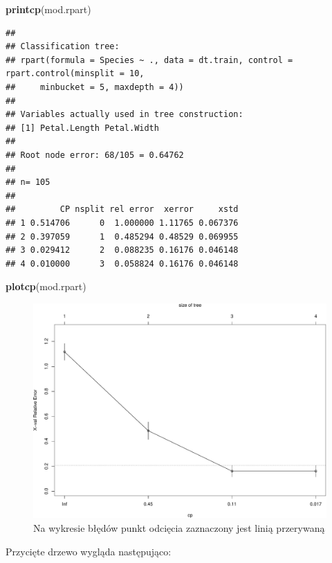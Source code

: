 \documentclass[
]{book}
\newenvironment{Shaded}{\begin{snugshade}}{\end{snugshade}}
\newcommand{\KeywordTok}[1]{\textcolor[rgb]{0.13,0.29,0.53}{\textbf{#1}}}
\newcommand{\NormalTok}[1]{#1}
\theoremstyle{plain}
\theoremstyle{definition}
\theoremstyle{definition}
\theoremstyle{definition}
\theoremstyle{definition}
\theoremstyle{remark}
\begin{document}
\begin{Shaded}
\begin{Highlighting}[]
\KeywordTok{printcp}\NormalTok{(mod.rpart)}
\end{Highlighting}
\end{Shaded}

\begin{verbatim}
## 
## Classification tree:
## rpart(formula = Species ~ ., data = dt.train, control = rpart.control(minsplit = 10, 
##     minbucket = 5, maxdepth = 4))
## 
## Variables actually used in tree construction:
## [1] Petal.Length Petal.Width 
## 
## Root node error: 68/105 = 0.64762
## 
## n= 105 
## 
##         CP nsplit rel error  xerror     xstd
## 1 0.514706      0  1.000000 1.11765 0.067376
## 2 0.397059      1  0.485294 0.48529 0.069955
## 3 0.029412      2  0.088235 0.16176 0.046148
## 4 0.010000      3  0.058824 0.16176 0.046148
\end{verbatim}

\begin{Shaded}
\begin{Highlighting}[]
\KeywordTok{plotcp}\NormalTok{(mod.rpart)}
\end{Highlighting}
\end{Shaded}

\begin{figure}
\centering
\includegraphics{EksploracjaDanych_files/figure-latex/unnamed-chunk-17-1.pdf}
\caption{\label{fig:unnamed-chunk-17}Na wykresie błędów punkt odcięcia zaznaczony jest linią przerywaną}
\end{figure}

Przycięte drzewo wygląda następująco:
\end{document}

